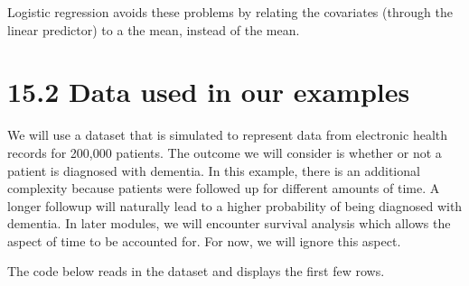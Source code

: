 \documentclass[letterpaper,10pt,english]{jupyterBook}
\begin{document}
\sphinxAtStartPar
Logistic regression avoids these problems by relating the covariates (through the linear predictor) to a  the mean, instead of the mean.


\section{15.2 Data used in our examples}
\label{\detokenize{15.c. Logistic Regression:data-used-in-our-examples}}\label{\detokenize{15.c. Logistic Regression::doc}}
\sphinxAtStartPar
We will use a dataset that is simulated to represent data from electronic health records for 200,000 patients. The outcome we will consider is whether or not a patient is diagnosed with dementia. In this example, there is an additional complexity because patients were followed up for different amounts of time. A longer follow\sphinxhyphen{}up will naturally lead to a higher probability of being diagnosed with dementia. In later modules, we will encounter survival analysis which allows the aspect of time to be accounted for. For now, we will ignore this aspect.

\sphinxAtStartPar
The code below reads in the dataset and displays the first few rows.
\end{document}
